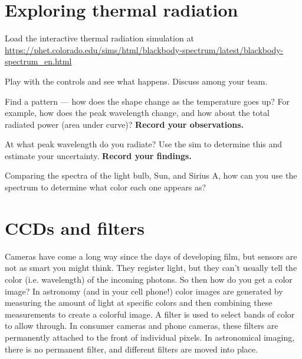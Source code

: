 \section{Exploring thermal radiation}\label{ic:sec:exploring}

\begin{steps}
	\item Load the interactive thermal radiation simulation at \url{https://phet.colorado.edu/sims/html/blackbody-spectrum/latest/blackbody-spectrum_en.html}
	
	\item Play with the controls and see what happens. Discuss among your team.
	
	\item Find a pattern --- how does the shape change as the temperature goes up? For example, how does the peak wavelength change, and how about the total radiated power (area under curve)? \textbf{Record your observations.}
	
	\item At what peak wavelength do you radiate? Use the sim to determine this and estimate your uncertainty. \textbf{Record your findings.}
	
	\item Comparing the spectra of the light bulb, Sun, and Sirius A, how can you use the spectrum to determine what color each one appears as?
\end{steps}

\section{CCDs and filters}

Cameras have come a long way since the days of developing film, but sensors are not as smart you might think. They register light, but they can't usually tell the color (i.e. wavelength) of the incoming photons. So then how do you get a color image? In astronomy (and in your cell phone!) color images are generated by measuring the amount of light at specific colors and then combining these measurements to create a colorful image. A filter is used to select bands of color to allow through. In consumer cameras and phone cameras, these filters are permanently attached to the front of individual pixels. In astronomical imaging, there is no permanent filter, and different filters are moved into place.

